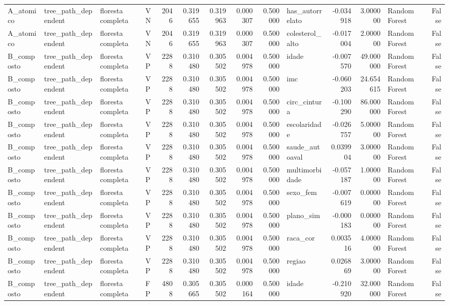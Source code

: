 \begin{tabular}{llllrrrrrlrrlr}
A_atomico & tree_path_dependent & floresta completa & VN & 2046 & 0.319655 & 0.319963 & 0.000307 & 0.500000 & has_autorrelato & -0.034918 & 3.000000 & Random Forest & False \\
A_atomico & tree_path_dependent & floresta completa & VN & 2046 & 0.319655 & 0.319963 & 0.000307 & 0.500000 & colesterol_alto & -0.017004 & 2.000000 & Random Forest & False \\
B_composto & tree_path_dependent & floresta completa & VP & 2288 & 0.310480 & 0.305502 & 0.004978 & 0.500000 & idade & -0.007570 & 49.000000 & Random Forest & False \\
B_composto & tree_path_dependent & floresta completa & VP & 2288 & 0.310480 & 0.305502 & 0.004978 & 0.500000 & imc & -0.060203 & 24.654615 & Random Forest & False \\
B_composto & tree_path_dependent & floresta completa & VP & 2288 & 0.310480 & 0.305502 & 0.004978 & 0.500000 & circ_cintura & -0.100290 & 86.000000 & Random Forest & False \\
B_composto & tree_path_dependent & floresta completa & VP & 2288 & 0.310480 & 0.305502 & 0.004978 & 0.500000 & escolaridade & -0.026757 & 5.000000 & Random Forest & False \\
B_composto & tree_path_dependent & floresta completa & VP & 2288 & 0.310480 & 0.305502 & 0.004978 & 0.500000 & saude_autoaval & 0.039904 & 3.000000 & Random Forest & False \\
B_composto & tree_path_dependent & floresta completa & VP & 2288 & 0.310480 & 0.305502 & 0.004978 & 0.500000 & multimorbidade & -0.057187 & 1.000000 & Random Forest & False \\
B_composto & tree_path_dependent & floresta completa & VP & 2288 & 0.310480 & 0.305502 & 0.004978 & 0.500000 & sexo_fem & -0.007619 & 0.000000 & Random Forest & False \\
B_composto & tree_path_dependent & floresta completa & VP & 2288 & 0.310480 & 0.305502 & 0.004978 & 0.500000 & plano_sim & -0.000183 & 0.000000 & Random Forest & False \\
B_composto & tree_path_dependent & floresta completa & VP & 2288 & 0.310480 & 0.305502 & 0.004978 & 0.500000 & raca_cor & 0.003516 & 4.000000 & Random Forest & False \\
B_composto & tree_path_dependent & floresta completa & VP & 2288 & 0.310480 & 0.305502 & 0.004978 & 0.500000 & regiao & 0.026869 & 3.000000 & Random Forest & False \\
B_composto & tree_path_dependent & floresta completa & FP & 4808 & 0.305665 & 0.305502 & 0.000164 & 0.500000 & idade & -0.210920 & 32.000000 & Random Forest & False \\

\end{tabular}
